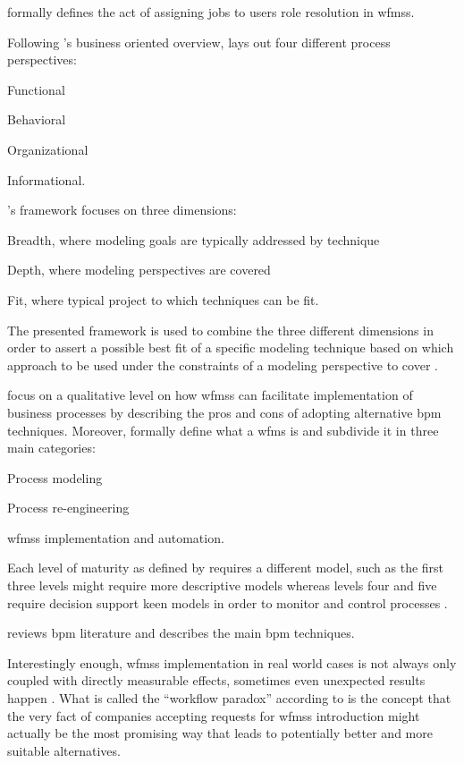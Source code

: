\citet{Cheng2000} formally defines the act of assigning jobs to users \ie role resolution in \glspl{wfms}.

Following \citet{Georgakopoulos1995}'s business oriented overview, \citet{Giaglis2001} lays out four different process perspectives:
\begin{enumerate*}
	\item Functional
	\item Behavioral
	\item Organizational
	\item Informational.
\end{enumerate*}
\citet{Giaglis2001}'s framework focuses on three dimensions:
\begin{enumerate*}
	\item Breadth, where modeling goals are typically addressed by technique
	\item Depth, where modeling perspectives are covered
	\item Fit, where typical project to which techniques can be fit.
\end{enumerate*}
The presented framework is used to combine the three different dimensions in order to assert a possible best fit of a specific modeling technique based on which approach to be used under the constraints of a modeling perspective to cover \citep{Giaglis2001}.

\citet{Mentzas2001} focus on a qualitative level on how \glspl{wfms} can facilitate implementation of business processes by describing the pros and cons of adopting alternative \gls{bpm} techniques. Moreover, \citet{Mentzas2001} formally define what a \gls{wfms} is and subdivide it in three main categories:
\begin{enumerate*}
	\item Process modeling
	\item Process re-engineering
	\item \glspl{wfms} implementation and automation.
\end{enumerate*}
Each level of maturity as defined by \citet{Macintosh1993} requires a different model, such as the first three levels might require more descriptive models whereas levels four and five require decision support keen models in order to monitor and control processes \citep{Mentzas2001}.

\citet{Aguilar-Saven2004} reviews \gls{bpm} literature and describes the main \gls{bpm} techniques.

Interestingly enough, \glspl{wfms} implementation in real world cases is not always only coupled with directly measurable effects, sometimes even unexpected results happen \citep{Reijers2005}. What is called the ``workflow paradox'' according to \citet{Reijers2005} is the concept that the very fact of companies accepting requests for \glspl{wfms} introduction might actually be the most promising way that leads to potentially better and more suitable alternatives.

